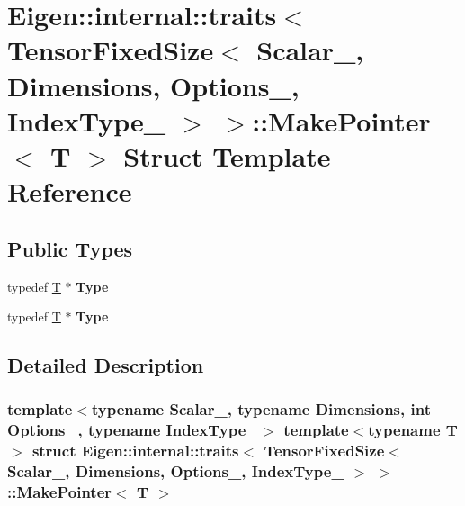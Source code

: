 \hypertarget{struct_eigen_1_1internal_1_1traits_3_01_tensor_fixed_size_3_01_scalar___00_01_dimensions_00_01_oec1d8e96ca2c261993f05f9c1095a180}{}\section{Eigen\+:\+:internal\+:\+:traits$<$ Tensor\+Fixed\+Size$<$ Scalar\+\_\+, Dimensions, Options\+\_\+, Index\+Type\+\_\+ $>$ $>$\+:\+:Make\+Pointer$<$ T $>$ Struct Template Reference}
\label{struct_eigen_1_1internal_1_1traits_3_01_tensor_fixed_size_3_01_scalar___00_01_dimensions_00_01_oec1d8e96ca2c261993f05f9c1095a180}
\subsection*{Public Types}
\begin{DoxyCompactItemize}
\item 
\mbox{\label{struct_eigen_1_1internal_1_1traits_3_01_tensor_fixed_size_3_01_scalar___00_01_dimensions_00_01_oec1d8e96ca2c261993f05f9c1095a180_ab9c45d0086ae383d6407ac6d0d9e4e94}} 
typedef \hyperlink{group___sparse_core___module}{T} $\ast$ {\bfseries Type}
\item 
\mbox{\label{struct_eigen_1_1internal_1_1traits_3_01_tensor_fixed_size_3_01_scalar___00_01_dimensions_00_01_oec1d8e96ca2c261993f05f9c1095a180_ab9c45d0086ae383d6407ac6d0d9e4e94}} 
typedef \hyperlink{group___sparse_core___module}{T} $\ast$ {\bfseries Type}
\end{DoxyCompactItemize}


\subsection{Detailed Description}
\subsubsection*{template$<$typename Scalar\+\_\+, typename Dimensions, int Options\+\_\+, typename Index\+Type\+\_\+$>$\newline
template$<$typename T$>$\newline
struct Eigen\+::internal\+::traits$<$ Tensor\+Fixed\+Size$<$ Scalar\+\_\+, Dimensions, Options\+\_\+, Index\+Type\+\_\+ $>$ $>$\+::\+Make\+Pointer$<$ T $>$}



